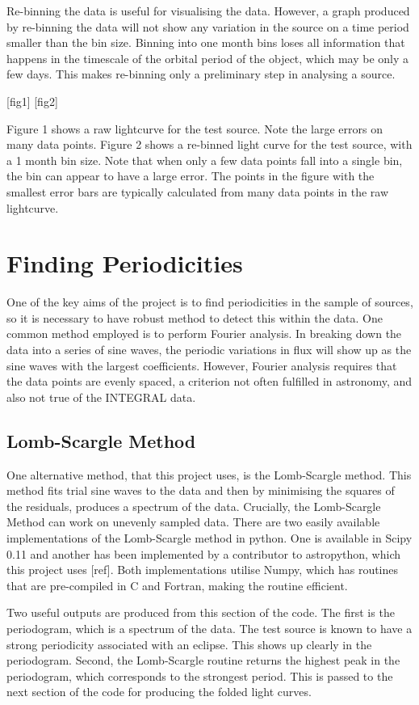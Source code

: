 Re-binning the data is useful for visualising the data. However, a graph produced by re-binning the data will not show any variation in the source on a time period smaller than the bin size. Binning into one month bins loses all information that happens in the timescale of the orbital period of the object, which may be only a few days. This makes re-binning only a preliminary step in analysing a source. 

[fig1]
[fig2]

Figure 1 shows a raw lightcurve for the test source. Note the large errors on many data points. 
Figure 2 shows a re-binned light curve for the test source, with a 1 month bin size. Note that when only a few data points fall into a single bin, the bin can appear to have a large error. The points in the figure with the smallest error bars are typically calculated from many data points in the raw lightcurve.

\section{Finding Periodicities}
One of the key aims of the project is to find periodicities in the sample of sources, so it is necessary to have robust method to detect this within the data. One common method employed is to perform Fourier analysis. In breaking down the data into a series of sine waves, the periodic variations in flux will show up as the sine waves with the largest coefficients. However, Fourier analysis requires that the data points are evenly spaced, a criterion not often fulfilled in astronomy, and also not true of the INTEGRAL data.

\subsection{Lomb-Scargle Method}
One alternative method, that this project uses, is the Lomb-Scargle method. This method fits trial sine waves to the data and then by minimising the squares of the residuals, produces a spectrum of the data. Crucially, the Lomb-Scargle Method can work on unevenly sampled data. 
There are two easily available implementations of the Lomb-Scargle method in python. One is available in Scipy 0.11 and another has been implemented by a contributor to astropython, which this project uses [ref]. Both implementations utilise Numpy, which has routines that are pre-compiled in C and Fortran, making the routine efficient.

Two useful outputs are produced from this section of the code. The first is the periodogram, which is a spectrum of the data. The test source is known to have a strong periodicity associated with an eclipse. This shows up clearly in the periodogram. Second, the Lomb-Scargle routine returns the highest peak in the periodogram, which corresponds to the strongest period. This is passed to the next section of the code for producing the folded light curves.

